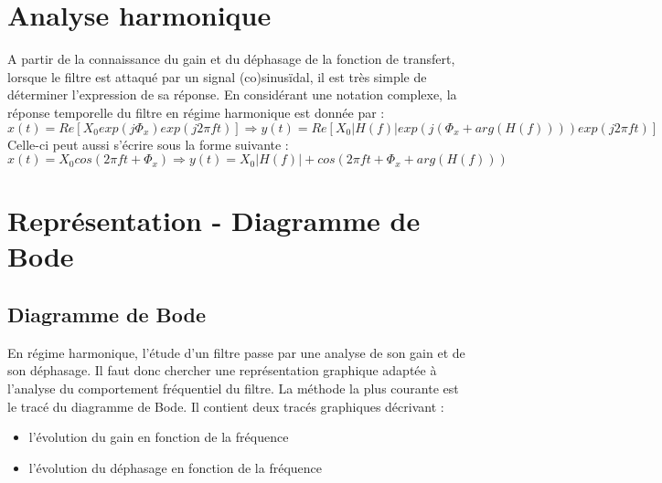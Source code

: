 	\vspace{1\baselineskip}
	
	\section{Analyse harmonique}
	A partir de la connaissance du gain et du déphasage de la fonction de transfert, lorsque le filtre est attaqué par un signal (co)sinusïdal, il est très simple de déterminer l'expression de sa réponse. En considérant une notation complexe, la réponse temporelle du filtre en régime harmonique est donnée par :
	\begin{equation}\label{}
	x(t) = Re[X_{0}exp(j\Phi_{x})exp(j2\pi ft)] \Rightarrow y(t) = Re[X_{0}|H(f)|exp(j(\Phi_{x}+arg(H(f))))exp(j2\pi ft)]
	\end{equation}
	Celle-ci peut aussi s'écrire sous la forme suivante :
	\begin{equation}\label{key}
	x(t) = X_{0}cos(2\pi ft+\Phi_{x}) \Rightarrow y(t) = X_{0}|H(f)|+cos(2\pi ft+\Phi_{x}+arg(H(f)))
	\end{equation}
	
	\section{Représentation - Diagramme de Bode}
	\subsection{Diagramme de Bode}
	En régime harmonique, l'étude d'un filtre passe par une analyse de son gain et de son déphasage. Il faut donc chercher une représentation graphique adaptée à l'analyse du comportement fréquentiel du filtre. La méthode la plus courante est le tracé du diagramme de Bode. Il contient deux tracés graphiques décrivant :
	\begin{itemize}
		\item l'évolution du gain en fonction de la fréquence
		\item l'évolution du déphasage en fonction de la fréquence
	\end{itemize}

	\vspace{0.5\baselineskip}

